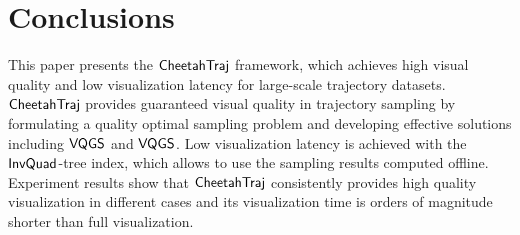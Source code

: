 \section{Conclusions}\label{sec:con}


This paper presents the $\mathsf{CheetahTraj}$ framework, which achieves high visual quality and low visualization latency for large-scale trajectory datasets. $\mathsf{CheetahTraj}$ provides guaranteed visual quality in trajectory sampling by formulating a quality optimal sampling problem and developing effective solutions including $\mathsf{VQGS}$ and $\mathsf{VQGS}$. Low visualization latency is achieved with the $\mathsf{InvQuad}$-tree index, which allows to use the sampling results computed offline. Experiment results show that $\mathsf{CheetahTraj}$ consistently provides high quality visualization in different cases and its visualization time is orders of magnitude shorter than full visualization.

